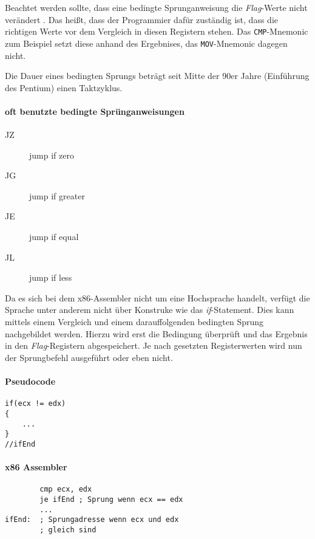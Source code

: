 Beachtet werden sollte, dass eine bedingte Sprunganweisung die \textit{Flag}-Werte nicht verändert . Das heißt, dass der Programmier dafür zuständig ist, dass die richtigen Werte vor dem Vergleich in diesen Registern stehen. Das \texttt{CMP}-Mnemonic zum Beispiel setzt diese anhand des Ergebnises, das \texttt{MOV}-Mnemonic dagegen nicht.

Die Dauer eines bedingten Sprungs beträgt seit Mitte der 90er Jahre (Einführung des Pentium) einen Taktzyklus.

\paragraph{oft benutzte bedingte Sprünganweisungen}
\begin{description}
	\item [JZ] jump if zero
	\item [JG] jump if greater 
	\item [JE] jump if equal 
	\item [JL] jump if less 
\end{description}


Da es sich bei dem x86-Assembler nicht um eine Hochsprache handelt, verfügt die Sprache unter anderem nicht über Konstruke wie das \textit{if}-Statement. Dies kann mittels einem Vergleich und einem darauffolgenden bedingten Sprung nachgebildet werden.
Hierzu wird erst die Bedingung überprüft und das Ergebnis in den \textit{Flag}-Registern abgespeichert.
Je nach gesetzten Registerwerten wird nun der Sprungbefehl ausgeführt oder eben nicht.

\begin{multicols}{2}
\paragraph{Pseudocode}
\begin{verbatim}
if(ecx != edx)
{
	...
}
//ifEnd
\end{verbatim}

\paragraph{x86 Assembler}
\begin{verbatim}
        cmp ecx, edx
        je ifEnd ; Sprung wenn ecx == edx
        ...
ifEnd:  ; Sprungadresse wenn ecx und edx
        ; gleich sind 
\end{verbatim}
\end{multicols}


